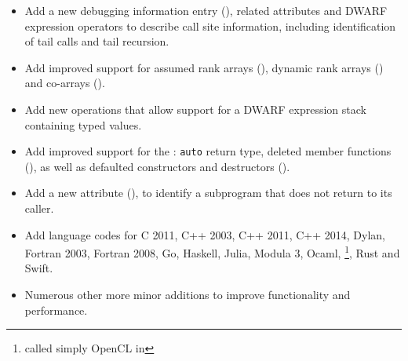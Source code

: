 \begin{itemize}
\item Add a new debugging information entry (\DWTAGcallsiteNAME), related
attributes and DWARF expression operators to describe call site information,
including identification of tail calls and tail recursion.
\item Add improved support for  assumed rank arrays
(\DWTAGgenericsubrangeNAME), dynamic rank arrays (\DWATrankNAME)
and co-arrays (\DWTAGcoarraytypeNAME{}).
\item Add new operations that allow support for
a DWARF expression stack containing typed values.
\item Add improved support for the :
\texttt{auto} return type, deleted member functions (\DWATdeletedNAME),
as well as defaulted constructors and destructors (\DWATdefaultedNAME).
\item Add a new attribute (\DWATnoreturnNAME{}), to identify
a subprogram that does not return to its caller.
\item Add language codes for C 2011, C++ 2003, C++ 2011, C++ 2014,
Dylan, Fortran 2003, Fortran 2008, Go, Haskell,
Julia, Modula 3, Ocaml,
\bb
\OpenCLC\footnote{called simply OpenCL in \DWARFVersionV},
\eb
Rust and Swift.
\item Numerous other more minor additions to improve functionality
and performance.
\end{itemize}

